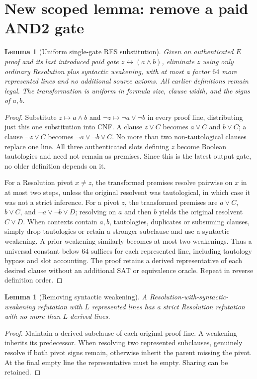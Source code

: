 \documentclass[11pt]{article}
\newtheorem{lemma}[theorem]{Lemma}
\begin{document}
\section*{New scoped lemma: remove a paid AND2 gate}
\begin{lemma}[Uniform single-gate RES substitution]
Given an authenticated $E$ proof and its last introduced paid gate $z\leftrightarrow(a\land b)$, eliminate $z$ using only ordinary Resolution plus syntactic weakening, with at most a factor $64$ more represented lines and no additional source axioms. All earlier definitions remain legal. The transformation is uniform in formula size, clause width, and the signs of $a,b$.
\end{lemma}
\begin{proof}
Substitute $z\mapsto a\land b$ and $\neg z\mapsto\neg a\vee\neg b$ in every proof line, distributing just this one substitution into CNF. A clause $z\vee C$ becomes $a\vee C$ and $b\vee C$; a clause $\neg z\vee C$ becomes $\neg a\vee\neg b\vee C$. No more than two non-tautological clauses replace one line. All three authenticated slots defining $z$ become Boolean tautologies and need not remain as premises. Since this is the latest output gate, no older definition depends on it.

For a Resolution pivot $x\ne z$, the transformed premises resolve pairwise on $x$ in at most two steps, unless the original resolvent was tautological, in which case it was not a strict inference. For a pivot $z$, the transformed premises are $a\vee C$, $b\vee C$, and $\neg a\vee\neg b\vee D$; resolving on $a$ and then $b$ yields the original resolvent $C\vee D$. When contexts contain $a,b$, tautologies, duplicates or subsuming clauses, simply drop tautologies or retain a stronger subclause and use a syntactic weakening. A prior weakening similarly becomes at most two weakenings. Thus a universal constant below $64$ suffices for each represented line, including tautology bypass and slot accounting. The proof retains a derived representative of each desired clause without an additional SAT or equivalence oracle. Repeat in reverse definition order.
\end{proof}

\begin{lemma}[Removing syntactic weakening]
A Resolution-with-syntactic-weakening refutation with $L$ represented lines has a strict Resolution refutation with no more than $L$ derived lines.
\end{lemma}
\begin{proof}
Maintain a derived subclause of each original proof line. A weakening inherits its predecessor. When resolving two represented subclauses, genuinely resolve if both pivot signs remain, otherwise inherit the parent missing the pivot. At the final empty line the representative must be empty. Sharing can be retained.
\end{proof}
\end{document}
